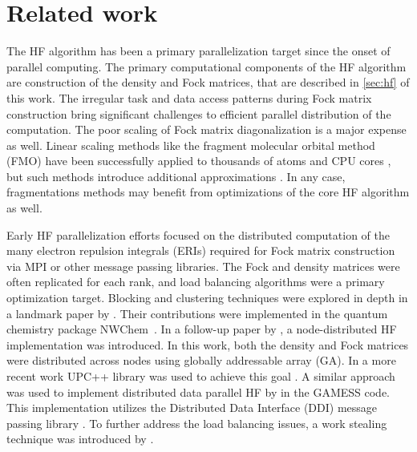 \section{Related work}
\label{sec:related}
The HF algorithm has been a primary parallelization target since the onset of parallel computing. The primary computational components of the HF algorithm are construction of the density and Fock matrices, that are described in \cref{sec:hf} of this work. The irregular task and data access patterns during Fock matrix construction bring significant challenges to efficient parallel distribution of the computation. The poor scaling of Fock matrix diagonalization is a major expense as well. Linear scaling methods like the fragment molecular orbital method (FMO) have been successfully applied to thousands of atoms and CPU cores \cite{alexeev2012heuristic,umeda2010parallel}, but such methods introduce additional approximations \cite{fedorov2007extending,fedorov2009}. In any case, fragmentations methods may benefit from optimizations of the core HF algorithm as well.

Early HF parallelization efforts focused on the distributed computation of the many electron repulsion integrals (ERIs) required for Fock matrix construction via MPI or other message passing libraries. The Fock and density matrices were often replicated for each rank, and load balancing algorithms were a primary optimization target. Blocking and clustering techniques were explored in depth in a landmark paper by \citet{foster1996toward}. Their contributions were implemented in the quantum chemistry package NWChem~\cite{valiev2010nwchem}. In a follow-up paper by \citet{harrison1996toward}, a node-distributed HF implementation was introduced. In this work, both the density and Fock matrices were distributed across nodes using globally addressable array (GA). In a more recent work UPC++ library was used to achieve this goal \cite{ozog2016hartree}. A similar approach was used to implement distributed data parallel HF by \cite{alexeev2002distributed,alexeev2007parallel} in the GAMESS code. This implementation utilizes the Distributed Data Interface (DDI) message passing library \cite{fletcher2000distributed}. To further address the load balancing issues, a work stealing technique was introduced by \citet{liu2014new}.


